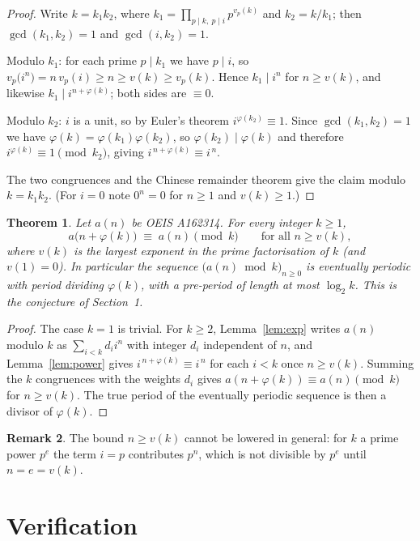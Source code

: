\documentclass[11pt,a4paper]{article}
\theoremstyle{plain}
\newtheorem{theorem}{Theorem}
\theoremstyle{definition}
\newtheorem{remark}[theorem]{Remark}
\begin{document}
\begin{proof}
Write $k=k_1k_2$, where $k_1=\prod_{p\mid k,\ p\mid i}p^{v_p(k)}$ and $k_2=k/k_1$; then
$\gcd(k_1,k_2)=1$ and $\gcd(i,k_2)=1$.

Modulo $k_1$: for each prime $p\mid k_1$ we have $p\mid i$, so
$v_p\bigl(i^{n}\bigr)=n\,v_p(i)\ge n\ge v(k)\ge v_p(k)$. Hence $k_1\mid i^{n}$ for
$n\ge v(k)$, and likewise $k_1\mid i^{n+\varphi(k)}$; both sides are $\equiv 0$.

Modulo $k_2$: $i$ is a unit, so by Euler's theorem $i^{\varphi(k_2)}\equiv 1$. Since
$\gcd(k_1,k_2)=1$ we have $\varphi(k)=\varphi(k_1)\varphi(k_2)$, so
$\varphi(k_2)\mid\varphi(k)$ and therefore $i^{\varphi(k)}\equiv 1 \pmod{k_2}$, giving
$i^{\,n+\varphi(k)}\equiv i^{\,n}$.

The two congruences and the Chinese remainder theorem give the claim modulo $k=k_1k_2$.
(For $i=0$ note $0^{n}=0$ for $n\ge 1$ and $v(k)\ge1$.)
\end{proof}

\begin{theorem}\label{thm:main}
Let $a(n)$ be OEIS A162314. For every integer $k\ge1$,
\[
a\bigl(n+\varphi(k)\bigr)\;\equiv\;a(n)\pmod{k}\qquad\text{for all } n\ge v(k),
\]
where $v(k)$ is the largest exponent in the prime factorisation of $k$ (and $v(1)=0$).
In particular the sequence $\bigl(a(n)\bmod k\bigr)_{n\ge0}$ is eventually periodic with
period dividing $\varphi(k)$, with a pre-period of length at most $\log_2 k$. This is the
conjecture of Section~1.
\end{theorem}

\begin{proof}
The case $k=1$ is trivial. For $k\ge2$, Lemma~\ref{lem:exp} writes $a(n)$ modulo $k$ as
$\sum_{i<k}d_i i^{n}$ with integer $d_i$ independent of $n$, and Lemma~\ref{lem:power}
gives $i^{\,n+\varphi(k)}\equiv i^{\,n}$ for each $i<k$ once $n\ge v(k)$. Summing the
$k$ congruences with the weights $d_i$ gives
$a(n+\varphi(k))\equiv a(n)\pmod k$ for $n\ge v(k)$. The true period of the eventually
periodic sequence is then a divisor of $\varphi(k)$.
\end{proof}

\begin{remark}
The bound $n\ge v(k)$ cannot be lowered in general: for $k$ a prime power $p^{e}$ the
term $i=p$ contributes $p^{n}$, which is not divisible by $p^{e}$ until $n=e=v(k)$.
\end{remark}

\section{Verification}
\end{document}
